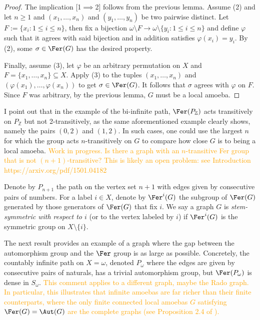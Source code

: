 \documentclass[12pt]{article}
\begin{document}
\begin{proof}
    The implication [1$\implies$2] follows from the previous lemma.
    Assume (2) and let $n\geq1$ and $(x_1,\dots,x_n)$ and $(y_1,\dots,y_n)$ be two pairwise distinct.
    Let $F:=\{x_i:1\leq i\leq n\}$, then fix a bijection $\omega\setminus F\to\omega\setminus\{y_i:1\leq i\leq n\}$ and define $\varphi$ such that it agrees with said bijection and in addition satisfies $\varphi(x_i)=y_i$.
    By (2), some $\sigma\in\Fer(G)$ has the desired property.

    Finally, assume (3), let $\varphi$ be an arbitrary permutation on $X$ and $F=\{x_1,\dots,x_n\}\subseteq X$.
    Apply (3) to the tuples $(x_1,\dots,x_n)$ and $(\varphi(x_1),\dots,\varphi(x_n))$ to get $\sigma\in\Fer(G)$.
    It follows that $\sigma$ agrees with $\varphi$ on $F$.
    Since $F$ was arbitrary, by the previous lemma, $G$ must be a local amoeba.
\end{proof}

I point out that in the example of the bi-infinite path, $\Fer(P_\mathbb Z)$ acts transitively on $P_\mathbb Z$ but not 2-transitively, as the same aforementioned example clearly shows, namely the pairs $(0,2)$ and $(1,2)$.
In such cases, one could use the largest $n$ for which the group acts $n$-transitively on $G$ to compare how close $G$ is to being a local amoeba.
\textcolor{orange}{Work in progress.
Is there a graph with an $n$-transitive Fer group that is not $(n+1)$-transitive? This is likely an open problem: see Introduction https://arxiv.org/pdf/1501.04182}

Denote by $P_{n+1}$ the path on the vertex set $n+1$ with edges given by consecutive pairs of numbers.
For a label $i\in X$, denote by $\Fer^i(G)$ the subgroup of $\Fer(G)$ generated by those generators of $\Fer(G)$ that fix $i$.
We say a graph $G$ is \emph{stem-symmetric with respect to $i$} (or to the vertex labeled by $i$) if $\Fer^i(G)$ is the symmetric group on $X\setminus\{i\}$.

The next result provides an example of a graph where the gap between the automorphism group and the $\Fer$ group is as large as possible.
Concretely, the countably infinite path on $X=\omega$, denoted $P_\omega$ where the edges are given by consecutive pairs of naturals, has a trivial automorphism group, but $\Fer(P_\omega)$ is dense in $S_\omega$. \textcolor{orange}{This comment applies to a different graph, maybe the Rado graph.
In particular, this illustrates that infinite amoebas are far richer than their finite counterparts, where the only finite connected local amoebas $G$ satisfying $\Fer(G)=\Aut(G)$ are the complete graphs (see Proposition 2.4 of \cite{seminal_paper}).}
\end{document}
